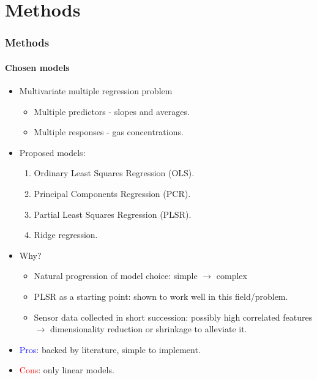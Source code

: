 \documentclass{beamer}
\begin{document}
\section{Methods}
\begin{frame}
	\frametitle{Methods}
	\framesubtitle{Chosen models}
	
	\begin{itemize}
		\pause
		\item Multivariate multiple regression problem
		\begin{itemize}
			\item Multiple predictors - slopes and averages.
			\item Multiple responses - gas concentrations.
		\end{itemize}
	\pause
		\item Proposed models:
		\begin{enumerate}
			\item Ordinary Least Squares Regression (OLS).
			\item Principal Components Regression (PCR).
			\item Partial Least Squares Regression (PLSR).
			\item Ridge regression.
		\end{enumerate}
	\pause
		\item Why?
			\begin{itemize}
				\pause
				\item Natural progression of model choice: simple $\rightarrow$ complex
				\pause
				\item PLSR as a starting point: shown to work well in this field/problem.
				\pause
				\item Sensor data collected in short succession: possibly high correlated features $\rightarrow$ dimensionality reduction or shrinkage to alleviate it.
			\end{itemize}
		\pause
		\item \textcolor{blue}{Pros}: backed by literature, simple to implement.
		\pause
		\item \textcolor{red}{Cons}: only linear models.
		
	\end{itemize}
	
\end{frame}
\end{document}
